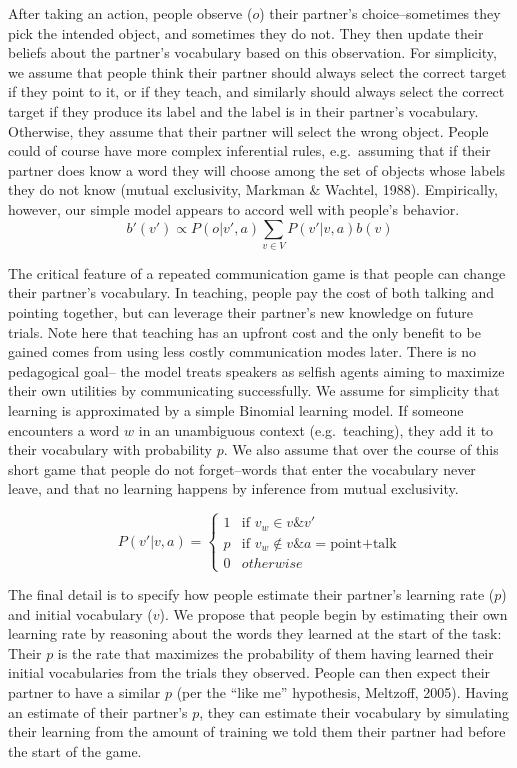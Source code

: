 \documentclass[english,,man,floatsintext]{apa6}
\begin{document}
After taking an action, people observe (\(o\)) their partner's choice--sometimes they pick the intended object, and sometimes they do not. They then update their beliefs about the partner's vocabulary based on this observation. For simplicity, we assume that people think their partner should always select the correct target if they point to it, or if they teach, and similarly should always select the correct target if they produce its label and the label is in their partner's vocabulary. Otherwise, they assume that their partner will select the wrong object. People could of course have more complex inferential rules, e.g.~assuming that if their partner does know a word they will choose among the set of objects whose labels they do not know (mutual exclusivity, Markman \& Wachtel, 1988). Empirically, however, our simple model appears to accord well with people's behavior.
\[
b'(v') \propto P\left(o|v',a\right) \sum_{v \in V}P\left(v'|v,a\right)b\left(v\right)
\]

The critical feature of a repeated communication game is that people can change their partner's vocabulary. In teaching, people pay the cost of both talking and pointing together, but can leverage their partner's new knowledge on future trials. Note here that teaching has an upfront cost and the only benefit to be gained comes from using less costly communication modes later. There is no pedagogical goal-- the model treats speakers as selfish agents aiming to maximize their own utilities by communicating successfully. We assume for simplicity that learning is approximated by a simple Binomial learning model. If someone encounters a word \(w\) in an unambiguous context (e.g.~teaching), they add it to their vocabulary with probability \(p\). We also assume that over the course of this short game that people do not forget--words that enter the vocabulary never leave, and that no learning happens by inference from mutual exclusivity.

\[
P\left(v'|v,a\right)= \begin{cases} 
1 & \text{if } v_{w} \in v \& v'\\ 
p & \text{if } v_{w} \notin v \& a = \text{point+talk}\\ 
0 & otherwise\end{cases}
\]

The final detail is to specify how people estimate their partner's learning rate (\(p\)) and initial vocabulary (\(v\)). We propose that people begin by estimating their own learning rate by reasoning about the words they learned at the start of the task: Their \(p\) is the rate that maximizes the probability of them having learned their initial vocabularies from the trials they observed. People can then expect their partner to have a similar \(p\) (per the ``like me'' hypothesis, Meltzoff, 2005). Having an estimate of their partner's \(p\), they can estimate their vocabulary by simulating their learning from the amount of training we told them their partner had before the start of the game.
\end{document}
